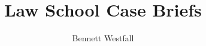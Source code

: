 \documentclass{article}
\title{Law School Case Briefs}
\author{Bennett Westfall}
\date{ }
\begin{document}
\maketitle
\newpage
\tableofcontents



\printindex
\end{document}
